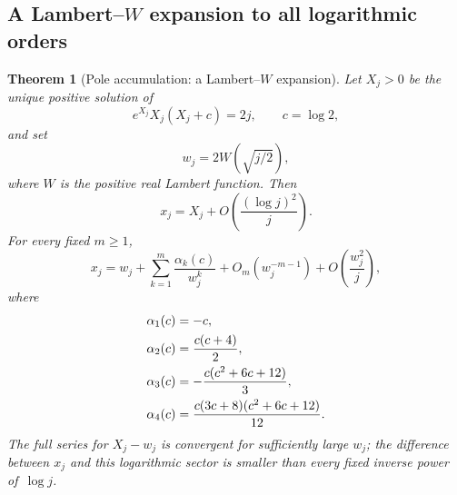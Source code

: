 \documentclass[11pt,a4paper]{article}
\numberwithin{equation}{section}
\newtheorem{theorem}{Theorem}[section]
\theoremstyle{definition}\newtheorem{definition}[theorem]{Definition}
\theoremstyle{remark}\newtheorem{remark}[theorem]{Remark}
\begin{document}
\subsection{A Lambert--\texorpdfstring{\(W\)}{W} expansion to all logarithmic orders}
\begin{theorem}[Pole accumulation: a Lambert--\(W\) expansion]\label{vmb:thm:W}
Let \(X_j>0\) be the unique positive solution of
\begin{equation}\label{vmb:eq:X}
e^{X_j}X_j(X_j+c)=2j,\qquad c=\log2,
\end{equation}
and set
\begin{equation}\label{vmb:eq:w}
w_j=2W\!\left(\sqrt{j/2}\right),
\end{equation}
where \(W\) is the positive real Lambert function. Then
\begin{equation}\label{vmb:eq:xX}
x_j=X_j+O\!\left(\frac{(\log j)^2}{j}\right).
\end{equation}
For every fixed \(m\geq1\),
\begin{equation}\label{vmb:eq:xW}
x_j=w_j+\sum_{k=1}^{m}\frac{\alpha_k(c)}{w_j^k}
 +O_m(w_j^{-m-1})+O\!\left(\frac{w_j^2}{j}\right),
\end{equation}
where
\begin{align}
\alpha_1(c)&=-c,\notag\\
\alpha_2(c)&=\frac{c(c+4)}2,\notag\\
\alpha_3(c)&=-\frac{c(c^2+6c+12)}3,\notag\\
\alpha_4(c)&=\frac{c(3c+8)(c^2+6c+12)}{12}.
\label{vmb:eq:alphas}
\end{align}
The full series for \(X_j-w_j\) is convergent for sufficiently large
\(w_j\); the difference between \(x_j\) and this logarithmic sector
is smaller than every fixed inverse power of~\(\log j\).
\end{theorem}
\end{document}
